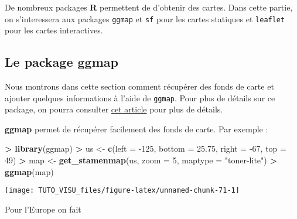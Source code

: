 \documentclass[]{article}
\newenvironment{Shaded}{\begin{snugshade}}{\end{snugshade}}
\newcommand{\DataTypeTok}[1]{\textcolor[rgb]{0.13,0.29,0.53}{#1}}
\newcommand{\DecValTok}[1]{\textcolor[rgb]{0.00,0.00,0.81}{#1}}
\newcommand{\FloatTok}[1]{\textcolor[rgb]{0.00,0.00,0.81}{#1}}
\newcommand{\KeywordTok}[1]{\textcolor[rgb]{0.13,0.29,0.53}{\textbf{#1}}}
\newcommand{\NormalTok}[1]{#1}
\newcommand{\OperatorTok}[1]{\textcolor[rgb]{0.81,0.36,0.00}{\textbf{#1}}}
\newcommand{\StringTok}[1]{\textcolor[rgb]{0.31,0.60,0.02}{#1}}
\theoremstyle{definition}
\theoremstyle{definition}
\theoremstyle{definition}
\theoremstyle{remark}
\begin{document}
De nombreux packages \textbf{R} permettent de d'obtenir des cartes. Dans cette partie, on s'interessera aux packages \texttt{ggmap} et \texttt{sf} pour les cartes statiques et \texttt{leaflet} pour les cartes interactives.

\hypertarget{le-package-ggmap}{%
\subsection{Le package ggmap}\label{le-package-ggmap}}

Nous montrons dans cette section comment récupérer des fonds de carte et ajouter quelques informations à l'aide de \texttt{ggmap}. Pour plus de détails sur ce package, on pourra consulter \href{https://journal.r-project.org/archive/2013-1/kahle-wickham.pdf}{cet article} pour plus de détails.

\textbf{ggmap} permet de récupérer facilement des fonds de carte. Par exemple :

\begin{Shaded}
\begin{Highlighting}[]
\OperatorTok{>}\StringTok{ }\KeywordTok{library}\NormalTok{(ggmap)}
\OperatorTok{>}\StringTok{ }\NormalTok{us <-}\StringTok{ }\KeywordTok{c}\NormalTok{(}\DataTypeTok{left =} \DecValTok{-125}\NormalTok{, }\DataTypeTok{bottom =} \FloatTok{25.75}\NormalTok{, }\DataTypeTok{right =} \DecValTok{-67}\NormalTok{, }\DataTypeTok{top =} \DecValTok{49}\NormalTok{)}
\OperatorTok{>}\StringTok{ }\NormalTok{map <-}\StringTok{ }\KeywordTok{get_stamenmap}\NormalTok{(us, }\DataTypeTok{zoom =} \DecValTok{5}\NormalTok{, }\DataTypeTok{maptype =} \StringTok{"toner-lite"}\NormalTok{)}
\OperatorTok{>}\StringTok{ }\KeywordTok{ggmap}\NormalTok{(map)}
\end{Highlighting}
\end{Shaded}

\begin{center}\texttt{[image: TUTO\_VISU\_files/figure-latex/unnamed-chunk-71-1]} \end{center}

Pour l'Europe on fait

\begin{Shaded}
\end{Shaded}
\end{document}
